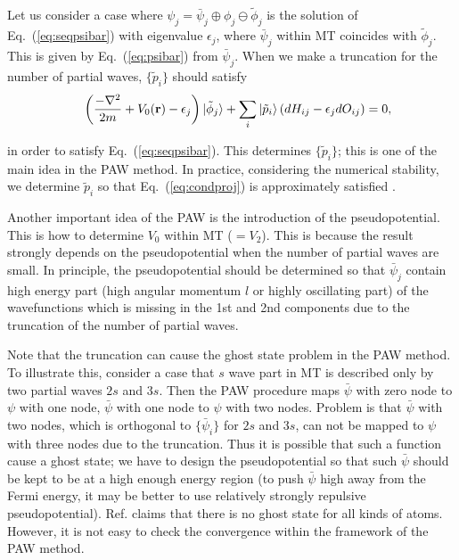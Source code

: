\documentclass[a4paper,10pt,aip,onecolumn,amsmath,amssymb,floatfix,rmp]{revtex4-1}
\newcommand{\bfr}{{\bf r}}
\def\tphi{{\tilde{\phi}}}
\newcommand{\req}[1]{\mbox{Eq.~\!(\ref{#1})}}
\begin{document}
\begin{widetext}
\begin{widetext}
Let us consider a case where
$\psi_j=\bar{\psi}_j \oplus \phi_j\ominus\tphi_j$
is the solution of \req{eq:seqpsibar} with eigenvalue $\epsilon_j$,
where $\bar{\psi}_j$ within MT coincides with $\tphi_j$.
This is given by \req{eq:psibar} from $\bar{\psi}_j$.
When we make a truncation for the number of partial waves,
$\{\tilde{p}_i\}$ should satisfy 
\begin{eqnarray}
&& \left( \frac{-\nabla^2}{2m}+V_0(\bfr)-\epsilon_j \right)|\tphi_j \rangle
 + \sum_i |\tilde{p}_i \rangle  
   \left(dH_{ij}-\epsilon_j dO_{ij} \right)  =0, \label{eq:condproj}
\end{eqnarray}
\end{widetext}
in order to satisfy \req{eq:seqpsibar}.
This determines $\{\tilde{p}_i\}$; this is one of the main idea in the PAW method. 
In practice, considering the numerical stability, 
we determine  $\tilde{p}_i$ so that \req{eq:condproj} is approximately
satisfied \cite{PAW}. 

Another important idea of the PAW is the introduction of the
pseudopotential. This is how to determine $V_0$ within MT ($=V_2$).
This is because the result strongly depends on the pseudopotential
when the number of partial waves are small. In principle, the pseudopotential 
should be determined so that $\bar{\psi}_j$ contain high energy part 
(high angular momentum $l$ or highly oscillating part) of the wavefunctions
which is missing in the 1st and 2nd components due to the 
truncation of the number of partial waves.

Note that the truncation can cause the ghost state problem in the PAW method.
To illustrate this, consider a case that $s$ wave part in MT is described
only by two partial waves $2s$ and $3s$. Then the PAW procedure maps $\bar{\psi}$ with zero node to 
$\psi$ with one node, $\bar{\psi}$ with one node to $\psi$ with two nodes. 
Problem is that $\bar{\psi}$ with two nodes, which is orthogonal to $\{\bar{\psi}_i\}$ for $2s$ and $3s$,
can not be mapped to $\psi$ with three nodes due to the truncation. 
Thus it is possible that such a function cause a ghost state;
we have to design the pseudopotential so that such $\bar{\psi}$ should be
kept to be at a high enough energy region (to push $\bar{\psi}$ high away from the
Fermi energy, it may be better to use relatively strongly repulsive pseudopotential). 
Ref.\cite{kresse99} claims that there is no
ghost state for all kinds of atoms. However, it is not easy
to check the convergence within the framework of the PAW method.


\end{widetext}
\end{document}
